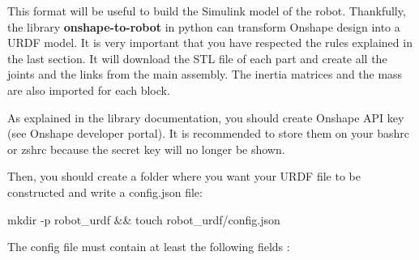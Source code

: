 \bigbreak
This format will be useful to build the Simulink model of the robot. Thankfully, the library \textbf{onshape-to-robot} in python can transform Onshape design into a URDF model. It is very important that you have respected the rules explained in the last section. It will download the STL file of each part and create all the joints and the links from the main assembly. The inertia matrices and the mass are also imported for each block. 

\bigbreak
As explained in the library documentation, you should create Onshape API key (see Onshape developer portal). It is recommended to store them on your bashrc or zshrc because the secret key will no longer be shown.

\bigbreak
\begin{center}
    \begin{minipage}{10cm}
    \end{minipage}
\end{center}

\bigbreak
Then, you should create a folder where you want your URDF file to be constructed and write a config.json file:
\begin{commandshell}
    mkdir -p robot\_urdf && touch robot\_urdf/config.json
\end{commandshell} 

\bigbreak
The config file must contain at least the following fields :
\begin{center}
    \begin{minipage}{8cm}
    \end{minipage}
\end{center}

